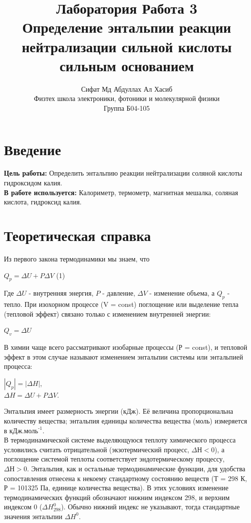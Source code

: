 \documentclass[a4paper, 12pt]{article}%
\author{Сифат Мд Абдуллах Ал Хасиб \\
Физтех школа электроники, фотоники и молекулярной физики \\
Группа Б04-105}
\title{\textbf{Лаборатория Работа 3 \\ 
Определение энтальпии реакции нейтрализации сильной кислоты сильным основанием}}
\begin{document}
\maketitle
\section{Введение}\textbf{Цель работы:} Определить энтальпию реакции нейтрализации соляной кислоты гидроксидом калия.\\
\textbf{В работе используется:} Калориметр, термометр, магнитная мешалка, соляная кислота, гидроксид калия. 
\section{Теоретическая справка}
Из первого закона термодинамики мы знаем, что\\
\begin{center}
$ Q_p = \Delta U+ P\Delta V$                     (1)
\end{center}
Где $\Delta U$ - внутренняя энергия, $P$ - давление, $\Delta V$ - изменение объема, а $Q_p$ - тепло. При изохорном процессе (V = const) поглощение или выделение тепла (тепловой эффект) связано только с изменением внутренней энергии:\\
\begin{center}
$Q_v = \Delta U$
\end{center}
В химии чаще всего рассматривают изобарные процессы (Р = const), и тепловой эффект в этом случае называют изменением энтальпии системы или энтальпией процесса:
\begin{center}
$|Q_p| = |\Delta H|$,\\
$\Delta H = \Delta U + P\Delta V.$
\end{center}
Энтальпия имеет размерность энергии (кДж). Её величина пропорциональна количеству вещества; энтальпия единицы количества вещества (моль) измеряется в $ \text{кДж.моль}^\text{-1}$.\\
\newpage В термодинамической системе выделяющуюся теплоту химического процесса условились считать отрицательной (экзотермический процесс, $\Delta Н < 0$), а поглощение системой теплоты соответствует эндотермическому процессу, $\Delta Н > 0$. Энтальпия, как и остальные термодинамические функции, для удобства сопоставления отнесена к некоему стандартному состоянию веществ (Т = 298 К, Р = 101325 Па, единице количества вещества). В этих условиях изменение термодинамических функций обозначают нижним индексом 298, и верхним  индексом 0 ($ \Delta H^0_{298}$). Обычно нижний индекс не указывают, тогда стандартные значения энтальпии $ \Delta H^0$.\\
\end{document}
